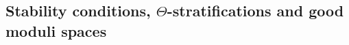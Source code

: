 \documentclass[12pt]{amsart}
\theoremstyle{definition}
\newtheorem{definition}{Definition}[section]
\newcommand{\BC}{{\mathbb{C}}}
\newcommand{\CA}{{\mathcal A}}
\newcommand{\CC}{{\mathcal C}}
\newcommand{\1}{\mathbf 1}
\newcommand{\FM}{{\mathfrak{M}}}
\newcommand{\bFM}{\boldsymbol{\FM}}
\newcommand{\Ext}{\mathcal{E}\text{xt}}
\newcommand{\Coh}{\mathrm{Coh}}
\renewcommand{\Ext}{\textup{Ext}}
\begin{document}










\subsection{Stability conditions, $\Theta$-stratifications and good moduli spaces}
\label{subsec: stabconditions}
\end{document}
